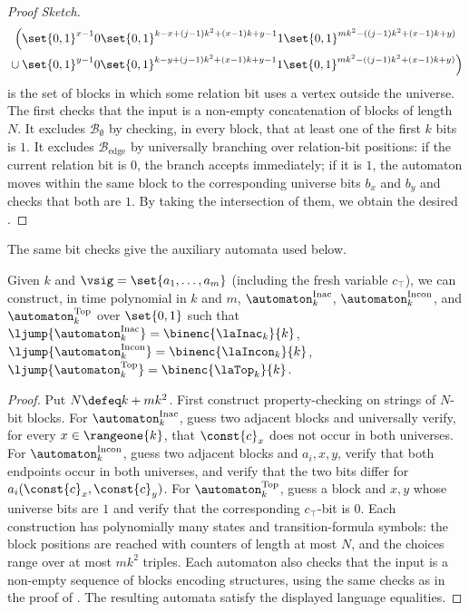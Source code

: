 \begin{proof}[Proof Sketch]
\begin{align*}
        \Big(&
        \set{0,1}^{x-1}0
        \set{0,1}^{k-x+(j-1)k^2+(x-1)k+y-1}
        1
        \set{0,1}^{mk^2-((j-1)k^2+(x-1)k+y)}
        \\
        {}\cup{}&
        \set{0,1}^{y-1}0
        \set{0,1}^{k-y+(j-1)k^2+(x-1)k+y-1}
        1
        \set{0,1}^{mk^2-((j-1)k^2+(x-1)k+y)}
        \Big)
    \end{align*}
    is the set of blocks in which some relation bit uses a vertex outside the universe.
    The  first checks that the input is a non-empty concatenation of blocks of length $N$.
    It excludes $\mathcal{B}_{\emptyset}$ by checking, in every block, that at least one of the first $k$ bits is $1$.
    It excludes $\mathcal{B}_{\mathrm{edge}}$ by universally branching over relation-bit positions:
    if the current relation bit is $0$, the branch accepts immediately;
    if it is $1$, the automaton moves within the same block to the corresponding universe bits $b_x$ and $b_y$ and checks that both are $1$.
    By taking the intersection of them, we obtain the desired .
\end{proof}

The same bit checks give the auxiliary automata used below.
\begin{lemma}\label{lemma: binary auxiliary languages}
Given $k$ and $\vsig=\set{a_1,\dots,a_m}$ (including the fresh variable $c_{\top}$),
we can construct, in time polynomial in $k$ and $m$, 
$\automaton_k^{\mathrm{Inac}}$, $\automaton_k^{\mathrm{Incon}}$, and
$\automaton_k^{\mathrm{Top}}$ over $\set{0,1}$ such that
$\ljump{\automaton_k^{\mathrm{Inac}}}=\binenc{\laInac_k}{k}$,
$\ljump{\automaton_k^{\mathrm{Incon}}}=\binenc{\laIncon_k}{k}$,
$\ljump{\automaton_k^{\mathrm{Top}}}=\binenc{\laTop_k}{k}$.
\end{lemma}
\begin{proof}
Put $N\defeq k+mk^2$.
First construct property-checking  on strings of $N$-bit blocks.
For $\automaton_k^{\mathrm{Inac}}$, guess two adjacent blocks and universally verify,
for every $x\in\rangeone{k}$, that $\const{c}_x$ does not occur in both universes.
For $\automaton_k^{\mathrm{Incon}}$, guess two adjacent blocks and $a_i,x,y$,
verify that both endpoints occur in both universes, and verify that the two bits differ for
$a_i(\const{c}_x,\const{c}_y)$.
For $\automaton_k^{\mathrm{Top}}$, guess a block and $x,y$ whose universe bits are $1$
and verify that the corresponding $c_{\top}$-bit is $0$.
Each construction has polynomially many states and transition-formula symbols:
the block positions are reached with counters of length at most $N$, and the choices range over
at most $m k^2$ triples.
Each automaton also checks that the input is a non-empty sequence of blocks encoding
structures, using the same checks as in the proof of .
The resulting automata satisfy the displayed language equalities.
\end{proof}

